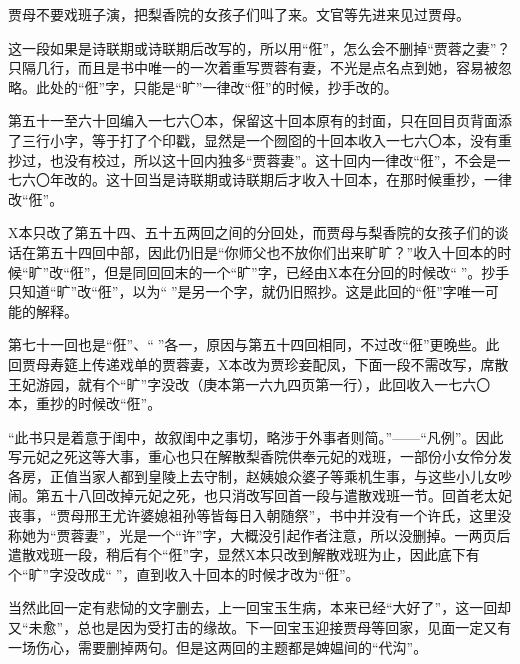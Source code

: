 \par 贾母不要戏班子演，把梨香院的女孩子们叫了来。文官等先进来见过贾母。
\par 这一段如果是诗联期或诗联期后改写的，所以用“俇”，怎么会不删掉“贾蓉之妻”？只隔几行，而且是书中唯一的一次着重写贾蓉有妻，不光是点名点到她，容易被忽略。此处的“俇”字，只能是“旷”一律改“俇”的时候，抄手改的。
\par 第五十一至六十回编入一七六〇本，保留这十回本原有的封面，只在回目页背面添了三行小字，等于打了个印戳，显然是一个囫囵的十回本收入一七六〇本，没有重抄过，也没有校过，所以这十回内独多“贾蓉妻”。这十回内一律改“俇”，不会是一七六〇年改的。这十回当是诗联期或诗联期后才收入十回本，在那时候重抄，一律改“俇”。
\par X本只改了第五十四、五十五两回之间的分回处，而贾母与梨香院的女孩子们的谈话在第五十四回中部，因此仍旧是“你师父也不放你们出来旷旷？”收入十回本的时候“旷”改“俇”，但是同回回末的一个“旷”字，已经由X本在分回的时候改“𤞘”。抄手只知道“旷”改“俇”，以为“𤞘”是另一个字，就仍旧照抄。这是此回的“俇”字唯一可能的解释。
\par 第七十一回也是“俇”、“𤞘”各一，原因与第五十四回相同，不过改“俇”更晚些。此回贾母寿筵上传递戏单的贾蓉妻，X本改为贾珍妾配凤，下面一段不需改写，席散王妃游园，就有个“旷”字没改（庚本第一六九四页第一行），此回收入一七六〇本，重抄的时候改“俇”。
\par “此书只是着意于闺中，故叙闺中之事切，略涉于外事者则简。”——“凡例”。因此写元妃之死这等大事，重心也只在解散梨香院供奉元妃的戏班，一部份小女伶分发各房，正值当家人都到皇陵上去守制，赵姨娘众婆子等乘机生事，与这些小儿女吵闹。第五十八回改掉元妃之死，也只消改写回首一段与遣散戏班一节。回首老太妃丧事，“贾母邢王尤许婆媳祖孙等皆每日入朝随祭”，书中并没有一个许氏，这里没称她为“贾蓉妻”，光是一个“许”字，大概没引起作者注意，所以没删掉。一两页后遣散戏班一段，稍后有个“俇”字，显然X本只改到解散戏班为止，因此底下有个“旷”字没改成“𤞘”，直到收入十回本的时候才改为“俇”。
\par 当然此回一定有悲恸的文字删去，上一回宝玉生病，本来已经“大好了”，这一回却又“未愈”，总也是因为受打击的缘故。下一回宝玉迎接贾母等回家，见面一定又有一场伤心，需要删掉两句。但是这两回的主题都是婢媪间的“代沟”。
